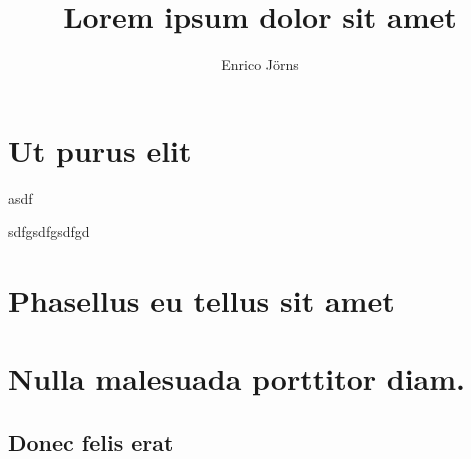 \documentclass[a4paper,11pt,bcor=10mm,marginright]{tubsartcl}
\title{Lorem ipsum dolor sit amet}
\author{Enrico Jörns}
\begin{document}
\maketitle[plain]



\tableofcontents

\twocolumn


\section{Ut purus elit}

\begin{gaussbox}[frame=fbox]{4}{1}{3}{3}
asdf
\end{gaussbox}

\lipsum[1]
\begin{gaussbox}[frame=fbox]{1}{1}{3}{3}
sdfgsdfgsdfgd
\end{gaussbox}
\section{Phasellus eu tellus sit amet}

\lipsum[2-5]

\section{Nulla malesuada porttitor diam.}

\lipsum[1-3]

\subsection{Donec felis erat}

\lipsum[4-7]
\end{document}
